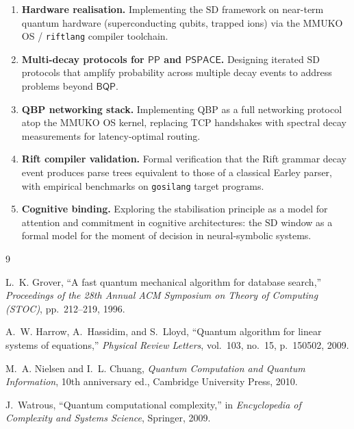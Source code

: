 \documentclass[11pt]{article}
\theoremstyle{plain}
\theoremstyle{definition}
\theoremstyle{remark}
\newcommand{\pspace}{\ensuremath{\mathsf{PSPACE}}}
\newcommand{\bqp}{\ensuremath{\mathsf{BQP}}}
\newcommand{\pp}{\ensuremath{\mathsf{PP}}}
\newcommand{\SD}{\ensuremath{\mathrm{SD}}}   %
\begin{document}
\begin{enumerate}
  \item \textbf{Hardware realisation.}  Implementing the \SD{} framework on
        near-term quantum hardware (superconducting qubits, trapped ions) via
        the MMUKO OS / \texttt{riftlang} compiler toolchain.

  \item \textbf{Multi-decay protocols for \pp{} and \pspace.}  Designing
        iterated \SD{} protocols that amplify probability across multiple
        decay events to address problems beyond $\bqp$.

  \item \textbf{QBP networking stack.}  Implementing QBP as a full
        networking protocol atop the MMUKO OS kernel, replacing TCP
        handshakes with spectral decay measurements for latency-optimal
        routing.

  \item \textbf{Rift compiler validation.}  Formal verification that the
        Rift grammar decay event produces parse trees equivalent to those of
        a classical Earley parser, with empirical benchmarks on
        \texttt{gosilang} target programs.

  \item \textbf{Cognitive binding.}  Exploring the stabilisation principle
        as a model for attention and commitment in cognitive architectures:
        the \SD{} window as a formal model for the moment of decision in
        neural-symbolic systems.
\end{enumerate}

\begin{thebibliography}{9}

  L.~K. Grover,
  ``A fast quantum mechanical algorithm for database search,''
  \emph{Proceedings of the 28th Annual ACM Symposium on Theory of Computing
  (STOC)}, pp.\ 212--219, 1996.

  A.~W. Harrow, A.~Hassidim, and S.~Lloyd,
  ``Quantum algorithm for linear systems of equations,''
  \emph{Physical Review Letters}, vol.\ 103, no.\ 15, p.\ 150502, 2009.

  M.~A. Nielsen and I.~L. Chuang,
  \emph{Quantum Computation and Quantum Information},
  10th anniversary ed., Cambridge University Press, 2010.

  J.~Watrous,
  ``Quantum computational complexity,''
  in \emph{Encyclopedia of Complexity and Systems Science},
  Springer, 2009.

\end{thebibliography}
\end{document}
